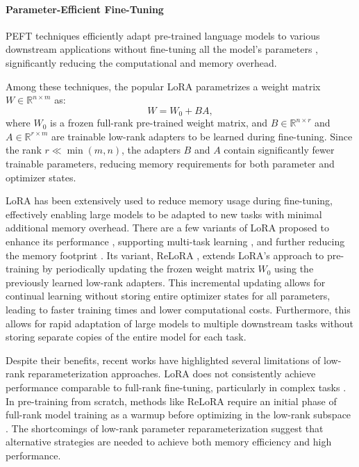 \paragraph{Parameter-Efficient Fine-Tuning}

PEFT techniques efficiently adapt pre-trained language models to various downstream applications without fine-tuning all the model's parameters \citep{dingDeltaTuningComprehensive2022}, significantly reducing the computational and memory overhead.

Among these techniques, the popular LoRA \citep{huLoRALowRankAdaptation2021} parametrizes a weight matrix $W \in \mathbb{R}^{n \times m}$ as:
\begin{equation}
 W = W_0 + BA,
\end{equation}
where $W_0$ is a frozen full-rank pre-trained weight matrix, and $B \in \mathbb{R}^{n \times r}$ and $A \in \mathbb{R}^{r \times m}$ are trainable low-rank adapters to be learned during fine-tuning. Since the rank $r \ll \min(m, n)$, the adapters $B$ and $A$ contain significantly fewer trainable parameters, reducing memory requirements for both parameter and optimizer states.

LoRA has been extensively used to reduce memory usage during fine-tuning, effectively enabling large models to be adapted to new tasks with minimal additional memory overhead. There are a few variants of LoRA proposed to enhance its performance \citep{renduchintalaTiedLoraEnhacingParameter2023, shengSLoRAServingThousands2023, zhangLORAFAMEMORYEFFICIENTLOWRANK, xiaChainLoRAEfficient2024}, supporting multi-task learning \citep{wangMultiLoRADemocratizingLoRA2023}, and further reducing the memory footprint \citep{dettmersQLoRAEfficientFinetuning2023}. Its variant, ReLoRA \citep{lialinReLoRAHighRankTraining2023}, extends LoRA's approach to pre-training by periodically updating the frozen weight matrix $W_0$ using the previously learned low-rank adapters. This incremental updating allows for continual learning without storing entire optimizer states for all parameters, leading to faster training times and lower computational costs. Furthermore, this allows for rapid adaptation of large models to multiple downstream tasks without storing separate copies of the entire model for each task.

Despite their benefits, recent works have highlighted several limitations of low-rank reparameterization approaches. LoRA does not consistently achieve performance comparable to full-rank fine-tuning, particularly in complex tasks \citep{xiaChainLoRAEfficient2024}. In pre-training from scratch, methods like ReLoRA require an initial phase of full-rank model training as a warmup before optimizing in the low-rank subspace \citep{lialinReLoRAHighRankTraining2023}. The shortcomings of low-rank parameter reparameterization suggest that alternative strategies are needed to achieve both memory efficiency and high performance.

